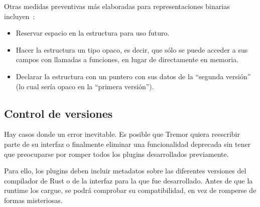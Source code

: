 Otras medidas preventivas más elaboradas para representaciones binarias
incluyen~\cite{swiftabi}:

\begin{itemize}
    \item Reservar espacio en la estructura para uso futuro.

    \item Hacer la estructura un tipo opaco, es decir, que sólo se puede acceder
        a sus campos con llamadas a funciones, en lugar de directamente en
        memoria.

    \item Declarar la estructura con un puntero con sus datos de la ``segunda
        versión'' (lo cual sería opaco en la ``primera versión'').

\end{itemize}

\subsection{Control de versiones}

Hay casos donde un error inevitable. Es posible que Tremor quiera reescribir
parte de su interfaz o finalmente eliminar una funcionalidad deprecada sin tener
que preocuparse por romper todos los plugins desarrollados previamente.

Para ello, los plugins deben incluir metadatos sobre las diferentes versiones
del compilador de Rust o de la interfaz para la que fue desarrollado. Antes de
que la runtime los cargue, se podrá comprobar su compatibilidad, en vez de
romperse de formas misteriosas.

